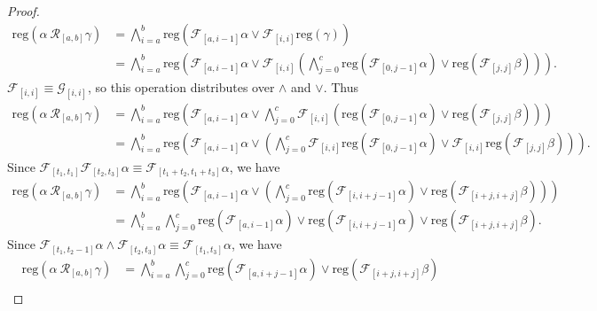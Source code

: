 \documentclass[runningheads]{llncs}
\begin{document}
\begin{proof}
\begin{align*}
\text{reg}\left(\alpha \ \mathcal{R}_{[a,b]}\gamma\right) &= \bigwedge_{i=a}^{b} \text{reg}\left(\mathcal{F}_{[a,i-1]}\alpha \lor \mathcal{F}_{[i, i]}\text{reg}\left(\gamma\right)\right)\\
&= \bigwedge_{i=a}^{b} \text{reg}\left(\mathcal{F}_{[a,i-1]}\alpha \lor  \mathcal{F}_{[i, i]}\left( \bigwedge_{j=0}^{c} \text{reg}\left(\mathcal{F}_{[0,j-1]}\alpha\right) \lor \text{reg}\left(\mathcal{F}_{[j, j]}\beta\right) \right) \right).
\end{align*}
$\mathcal{F}_{[i, i]} \equiv \mathcal{G}_{[i, i]}$, so this operation distributes over $\land$ and $\lor$. Thus
\begin{align*}
\text{reg}\left(\alpha \ \mathcal{R}_{[a,b]}\gamma\right) &= \bigwedge_{i=a}^{b} \text{reg}\left(\mathcal{F}_{[a,i-1]}\alpha \lor  \bigwedge_{j=0}^{c} \mathcal{F}_{[i, i]}\left( \text{reg}\left(\mathcal{F}_{[0,j-1]}\alpha\right) \lor \text{reg}\left(\mathcal{F}_{[j, j]}\beta\right) \right) \right) \\
&= \bigwedge_{i=a}^{b} \text{reg}\left(\mathcal{F}_{[a,i-1]}\alpha \lor \left( \bigwedge_{j=0}^{c} \mathcal{F}_{[i, i]}\text{reg}\left(\mathcal{F}_{[0,j-1]}\alpha\right) \lor \mathcal{F}_{[i, i]}\text{reg}\left(\mathcal{F}_{[j, j]}\beta \right) \right) \right).
\end{align*}
Since $\mathcal{F}_{[t_1,t_1]}\mathcal{F}_{[t_2,t_3]} \alpha \equiv \mathcal{F}_{[t_1+t_2,t_1+t_3]} \alpha$, we have
\begin{align*}
\text{reg}\left(\alpha \ \mathcal{R}_{[a,b]}\gamma\right) &= \bigwedge_{i=a}^{b} \text{reg}\left(\mathcal{F}_{[a,i-1]}\alpha \lor \left( \bigwedge_{j=0}^{c} \text{reg}\left(\mathcal{F}_{[i,i+j-1]}\alpha\right) \lor \text{reg}\left(\mathcal{F}_{[i+j, i+j]}\beta \right) \right) \right) \\
&= \bigwedge_{i=a}^{b}  \bigwedge_{j=0}^{c} \text{reg}\left(\mathcal{F}_{[a,i-1]}\alpha\right) \lor  \text{reg}\left(\mathcal{F}_{[i,i+j-1]}\alpha\right) \lor \text{reg}\left(\mathcal{F}_{[i+j, i+j]}\beta \right).
\end{align*}
Since $\mathcal{F}_{[t_1,t_2-1]} \alpha \land \mathcal{F}_{[t_2,t_3]} \alpha \equiv \mathcal{F}_{[t_1, t_3]} \alpha$, we have
\begin{align*}
\text{reg}\left(\alpha \ \mathcal{R}_{[a,b]}\gamma\right) &= \bigwedge_{i=a}^{b}  \bigwedge_{j=0}^{c} \text{reg}\left(\mathcal{F}_{[a,i+j-1]}\alpha\right) \lor \text{reg}\left(\mathcal{F}_{[i+j, i+j]}\beta  \right) \\

\end{align*}
\end{proof}
\end{document}
